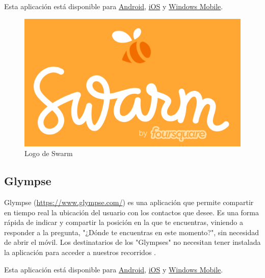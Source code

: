 Esta aplicación está disponible para \href{https://play.google.com/store/apps/details?id=com.foursquare.robin}{Android}, \href{https://itunes.apple.com/US/app/id870161082?mt=8}{iOS} y \href{https://www.microsoft.com/es-es/store/apps/swarm/9wzdncrdrsq1}{Windows Mobile}.

\begin{figure}[h!btp]
\centering
\includegraphics[scale=0.25, fbox={\fboxrule} 4mm]{images/03-antecedentes/39-swarm.png}
\caption{Logo de Swarm}
\label{fig:swarm}
\end{figure}

\subsection{Glympse}
Glympse (\url{https://www.glympse.com/}) es una aplicación que permite compartir en tiempo real la ubicación del usuario con los contactos que desee. Es una forma rápida de indicar y compartir la posición en la que te encuentras, viniendo a responder a la pregunta, "¿Dónde te encuentras en este momento?", sin necesidad de abrir el móvil. Los destinatarios de los "Glympses" no necesitan tener instalada la aplicación para acceder a nuestros recorridos \cite{Unk15}.

Esta aplicación está disponible para \href{https://play.google.com/store/apps/details?id=com.glympse.android.glympse}{Android}, \href{https://itunes.apple.com/app/glympse-share-gps-location/id330316698?mt=8}{iOS} y \href{https://www.microsoft.com/es-es/store/apps/glympse/9wzdncrdf9sj}{Windows Mobile}.

